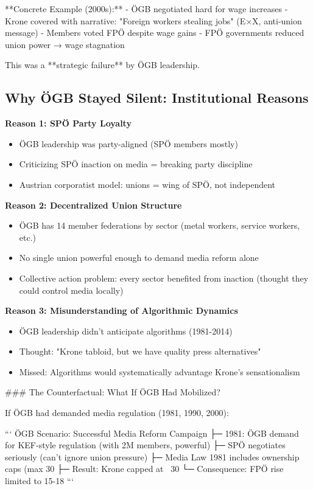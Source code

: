 **Concrete Example (2000s):**
- ÖGB negotiated hard for wage increases
- Krone covered with narrative: "Foreign workers stealing jobs" (E×X, anti-union message)
- Members voted FPÖ despite wage gains
- FPÖ governments reduced union power → wage stagnation

This was a **strategic failure** by ÖGB leadership.

\subsection*{Why ÖGB Stayed Silent: Institutional Reasons}

\textbf{Reason 1: SPÖ Party Loyalty}
\begin{itemize}
\item ÖGB leadership was party-aligned (SPÖ members mostly)
\item Criticizing SPÖ inaction on media = breaking party discipline
\item Austrian corporatist model: unions = wing of SPÖ, not independent
\end{itemize}

\textbf{Reason 2: Decentralized Union Structure}
\begin{itemize}
\item ÖGB has 14 member federations by sector (metal workers, service workers, etc.)
\item No single union powerful enough to demand media reform alone
\item Collective action problem: every sector benefited from inaction (thought they could control media locally)
\end{itemize}

\textbf{Reason 3: Misunderstanding of Algorithmic Dynamics}
\begin{itemize}
\item ÖGB leadership didn't anticipate algorithms (1981-2014)
\item Thought: "Krone tabloid, but we have quality press alternatives"
\item Missed: Algorithms would systematically advantage Krone's sensationalism
\end{itemize}

### The Counterfactual: What If ÖGB Had Mobilized?

If ÖGB had demanded media regulation (1981, 1990, 2000):

```
ÖGB Scenario: Successful Media Reform Campaign
├─ 1981: ÖGB demand for KEF-style regulation (with 2M members, powerful)
├─ SPÖ negotiates seriously (can't ignore union pressure)
├─ Media Law 1981 includes ownership caps (max 30%
├─ Result: Krone capped at ~30%
└─ Consequence: FPÖ rise limited to 15-18%
```

